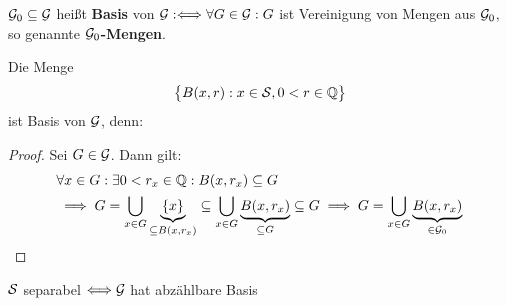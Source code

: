 \begin{definition} %
	$\G_0\subseteq\G$ heißt \textbf{Basis} von $\G:\Longleftrightarrow\forall G\in\G:G$ ist Vereinigung von Mengen aus $\G_0$,
	so genannte \textbf{$\G_0$-Mengen}.
\end{definition}

\begin{beispiel} %
	Die Menge
	\begin{align*}
		\big\lbrace B(x,r):x\in\S,0<r\in\Q\big\rbrace
	\end{align*}
	ist Basis von $\G$, denn:
	\begin{proof}
		Sei $G\in\G$. Dann gilt:
		\begin{align*}
			&\forall x\in G:\exists 0<r_x\in\Q:B(x,r_x)\subseteq G\\
			&\implies
			G=\bigcup\limits_{x\in G}\underbrace{\lbrace x\rbrace}_{\subseteq B(x,r_x)}\subseteq\bigcup\limits_{x\in G} \underbrace{B(x,r_x)}_{\subseteq G}\subseteq G\implies G=\bigcup\limits_{x\in G} \underbrace{B(x,r_x)}_{\in\G_0}
		\end{align*}
	\end{proof}
\end{beispiel}

\begin{satz}\label{satz2.9}
	$\S$ separabel $\Longleftrightarrow\G$ hat abzählbare Basis
\end{satz}

